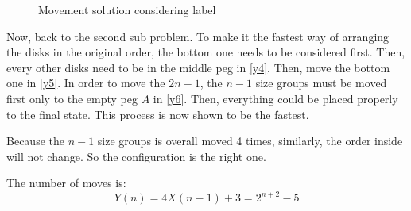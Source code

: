 \documentclass[a4paper,12pt]{article}
\makeatletter
\newtheorem*{solution}{Solution}
\theoremstyle{definition}
\renewenvironment{solution}[1][Solution] {\par\pushQED{\qed}\normalfont\topsep6\p@\@plus6\p@\relax\trivlist\item[\hskip\labelsep\bfseries#1\@addpunct{.}]\ignorespaces}{\popQED\endtrivlist\@endpefalse} \makeatother
\newenvironment{problems}{\begin{list}{}{\renewcommand{\makelabel}[1]{\textbf{##1}\hfil}}}{\end{list}}
\newenvironment{steps}{\begin{list}{}{\renewcommand{\makelabel}[1]{\textbf{##1}\hfil}}}{\end{list}}
\makeatother
\begin{document}
\begin{problems}
\begin{solution}
\begin{steps}
            \begin{figure}[h]
                \subfigure[Move $2n-1$ to $T$]{}
                \subfigure[Move $2n$ to $B$]{\label{y5}}
                \subfigure[Move $2n-1$ to $B$]{}
                \caption{Movement solution considering label}
            \end{figure}

            Now, back to the second sub problem. To make it the fastest way of arranging the disks in the original order, the bottom one needs to be considered first. Then, every other disks need to be in the middle peg in \ref{y4}. Then, move the bottom one in \ref{y5}. In order to move the $2n-1$, the $n-1$ size groups must be moved first only to the empty peg $A$ in \ref{y6}. Then, everything could be placed properly to the final state. This process is now shown to be the fastest.

            Because the $n-1$ size groups is overall moved 4 times, similarly, the order inside will not change. So the configuration is the right one.

            The number of moves is:
            \begin{equation*}
                Y(n) = 4X(n-1) + 3 = 2^{n+2} - 5
            \end{equation*}


        \end{steps}
    \end{solution}
\end{problems}
\end{document}
